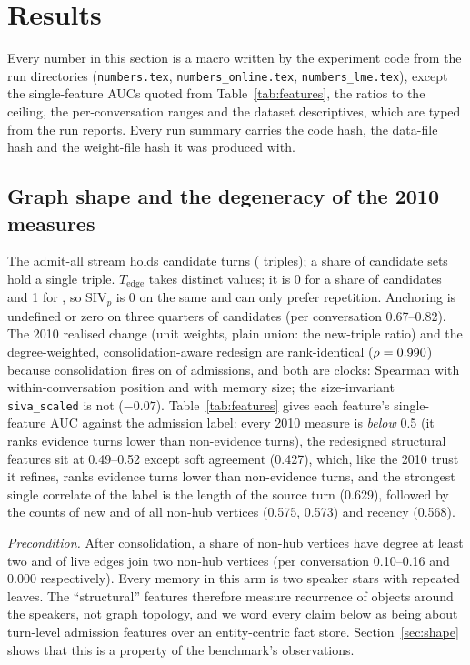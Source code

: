 \documentclass{ceurart}
\newcommand{\Tedge}{T_{\mathrm{edge}}}
\newcommand{\SIVp}{\mathrm{SIV}_p}
\newcommand{\code}[1]{\texttt{#1}}
\begin{document}
\section{Results}
\label{sec:results}

Every number in this section is a macro written by the experiment code from the run directories (\code{numbers.tex}, \code{numbers\_online.tex}, \code{numbers\_lme.tex}), except the single-feature AUCs quoted from Table~\ref{tab:features}, the ratios to the ceiling, the per-conversation ranges and the dataset descriptives, which are typed from the run reports. Every run summary carries the code hash, the data-file hash and the weight-file hash it was produced with.

\subsection{Graph shape and the degeneracy of the 2010 measures}
\label{sec:degeneracy}
The admit-all stream holds \nCandTurnsLc{} candidate turns (\nCandTriplesLc{} triples); a share \fracSingleTriple{} of candidate sets hold a single triple. $\Tedge$ takes \nDistinctTedge{} distinct values; it is 0 for a share \fracTedgeZero{} of candidates and 1 for \fracTedgeOne{}, so $\SIVp$ is 0 on the same \fracTedgeZero{} and can only prefer repetition. Anchoring is undefined or zero on three quarters of candidates (per conversation 0.67--0.82). The 2010 realised change (unit weights, plain union: the new-triple ratio) and the degree-weighted, consolidation-aware redesign are rank-identical ($\rho=0.990$) because consolidation fires on \consFireRateLc{} of admissions, and both are clocks: Spearman \corrSivaPosition{} with within-conversation position and \corrSivaPlainSize{} with memory size; the size-invariant \code{siva\_scaled} is not ($-0.07$). Table~\ref{tab:features} gives each feature's single-feature AUC against the admission label: every 2010 measure is \emph{below} 0.5 (it ranks evidence turns lower than non-evidence turns), the redesigned structural features sit at 0.49--0.52 except soft agreement (0.427), which, like the 2010 trust it refines, ranks evidence turns lower than non-evidence turns, and the strongest single correlate of the label is the length of the source turn (0.629), followed by the counts of new and of all non-hub vertices (0.575, 0.573) and recency (0.568).

\emph{Precondition.} After consolidation, a share \nonHubDegTwoShareLc{} of non-hub vertices have degree at least two and \nonHubEdgeShareLc{} of live edges join two non-hub vertices (per conversation 0.10--0.16 and 0.000 respectively). Every memory in this arm is two speaker stars with repeated leaves. The ``structural'' features therefore measure recurrence of objects around the speakers, not graph topology, and we word every claim below as being about turn-level admission features over an entity-centric fact store. Section~\ref{sec:shape} shows that this is a property of the benchmark's observations.
\end{document}
